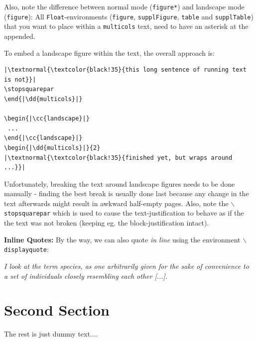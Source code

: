 \begin{multicols}{2}
Also, note the difference between normal mode (\texttt{figure*}) and landscape mode (\texttt{figure}):
All \texttt{Float}-environments (\texttt{figure}, \texttt{supplFigure}, \texttt{table} and \texttt{supplTable}) that you want to place within a \texttt{multicols} text, need to have an asterisk at the appended.

To embed a landscape figure within the text, the overall approach is:

\begin{tcolorbox}[arc=0pt,outer arc=0pt,breakable,colback=black!05,colframe=black!10,pad at break=2mm,boxrule=0.1pt]
\begin{lstlisting}
|\textnormal{\textcolor{black!35}{this long sentence of running text is not}}|
\stopsquarepar
\end{|\dd{multicols}|}

\begin{|\cc{landscape}|}
 ...
\end{|\cc{landscape}|}
\begin{|\dd{multicols}|}{2}
|\textnormal{\textcolor{black!35}{finished yet, but wraps around ...}}|
\end{lstlisting}
\end{tcolorbox}

Unfortunately, breaking the text around landscape figures needs to be done manually - finding the best break is usually done last because any change in the text afterwards might result in awkward half-empty pages.
Also, note the \texttt{$\backslash$stopsquarepar} which is used to cause the text-justification to behave as if the the text was not broken (keeping eg. the block-justification intact).

\textbf{Inline Quotes:} By the way, we can also quote \textit{in line} using the environment \texttt{$\backslash$displayquote}:

\begin{displayquote}
\textit{
I look at the term species, as one arbitrarily given for the sake of convenience to a set of individuals closely resembling each other [...].}
\hfill{}
\end{displayquote}

\section{Second Section}

The rest is just dummy text....

\lipsum[1]


\end{multicols}
